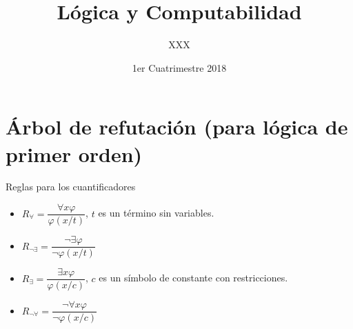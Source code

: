 \documentclass[a4paper,11pt]{article}
\title{Lógica y Computabilidad}
\author{XXX}
\date{1er Cuatrimestre 2018}
\theoremstyle{definition}
\theoremstyle{remark}
\begin{document}
\maketitle

\section{Árbol de refutación (para lógica de primer orden)}

Reglas para los cuantificadores

\begin{itemize}
    \item $R_{\forall} = \dfrac{\forall x \varphi}{\varphi(x/t)}$, $t$
    es un término sin variables.
    
    \item $R_{\lnot \exists} = \dfrac{\lnot \exists \varphi}{\lnot \varphi(x/t)}$
    
    \item $R_{\exists} = \dfrac{\exists x \varphi}{\varphi(x/c)}$,
    $c$ es un símbolo de constante con restricciones.
    
    \item $R_{\lnot \forall} = \dfrac{\lnot \forall x \varphi}{\lnot \varphi(x/c)}$
\end{itemize}
\end{document}
